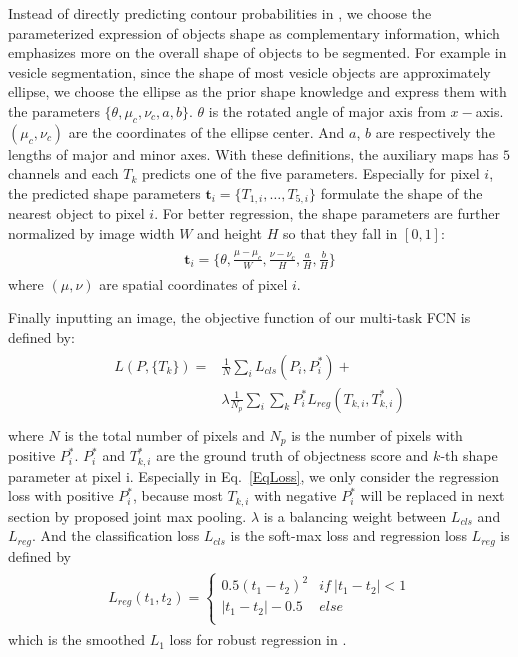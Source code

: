 Instead of directly predicting contour probabilities in \cite{Chen2017,Chen2016,Bertasius2016}, we choose the parameterized expression of objects shape as complementary information, which emphasizes more on the overall shape of objects to be segmented.
For example in vesicle segmentation, since the shape of most vesicle objects are approximately ellipse, we choose the ellipse as the prior shape knowledge and express them with the parameters $\{\theta, \mu_c, \nu_c, a, b\}$.
$\theta$ is the rotated angle of major axis from $x-$axis.
$(\mu_c, \nu_c)$ are the coordinates of the ellipse center.
And $a$, $b$ are respectively the lengths of major and minor axes.
With these definitions, the auxiliary maps has $5$ channels and each $T_k$ predicts one of the five parameters.
Especially for pixel $i$, the predicted shape parameters $\mathbf{t}_i= \{T_{1,i},\ldots,T_{5,i}\}$ formulate the shape of the nearest object to pixel $i$.
For better regression, the shape parameters are further normalized by image width $W$ and height $H$ so that they fall in $[0,1]$:
\begin{eqnarray}\label{EqPara}
\begin{aligned}
\mathbf{t}_{i} = \{\theta,\frac{\mu-\mu_c}{W},\frac{\nu-\nu_c}{H},\frac{a}{H},\frac{b}{H}\}
\end{aligned}
\end{eqnarray}
where $(\mu, \nu)$ are spatial coordinates of pixel $i$.

Finally inputting an image, the objective function of our multi-task FCN is defined by:
\begin{eqnarray}\label{EqLoss}
\begin{aligned}
L(P,\{T_k\}) =& \frac{1}{N}\sum_{i}L_{cls}(P_i,P^*_{i})+\\
&\lambda\frac{1}{N_p}\sum_{i}\sum_{k}P^*_{i}L_{reg}(T_{k,i},T^*_{k,i})\\
\end{aligned}
\end{eqnarray}
where $N$ is the total number of pixels and $N_p$ is the number of pixels with positive $P^*_i$.
$P^*_i$ and $T^*_{k,i}$ are the ground truth of objectness score and $k$-th shape parameter at pixel i.
Especially in Eq.~\ref{EqLoss}, we only consider the regression loss with positive $P^*_i$, because most $T_{k,i}$ with negative $P^*_i$ will be replaced in next section by proposed joint max pooling.
$\lambda$ is a balancing weight between $L_{cls}$ and $L_{reg}$.
And the classification loss $L_{cls}$ is the soft-max loss and regression loss $L_{reg}$ is defined by
\begin{eqnarray}
\label{EqSmoothL1}
\begin{aligned}
L_{reg}(t_1,t_2) =\left\{\begin{array}{cc}
0.5(t_1-t_2)^2&if~|t_1-t_2|<1\\
|t_1-t_2|-0.5&else\\
\end{array}\right.
\end{aligned}
\end{eqnarray}
which is the smoothed $L_1$ loss for robust regression in \cite{Ren2015}.


